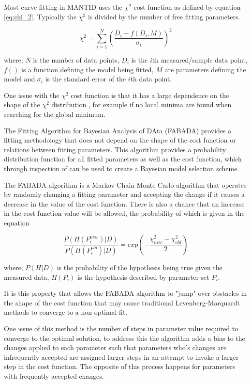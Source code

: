 \documentclass[a4paper]{article}
\begin{document}
Most curve fitting in \gls*{MANTID} uses the $\chi^{2}$ cost function as defined
by equation \ref{eq:chi_2}. Typically the $\chi^{2}$ is divided by the number of
free fitting parameters.

\begin{equation}
  \label{eq:chi_2}
  \chi^{2} = \sum_{i=1}^{N} \left(\frac{D_{i} - f(D_{i}, M)}{\sigma_{i}}\right)^{2}
\end{equation}

where; $N$ is the number of data points, $D_{i}$ is the $i$th measured/sample
data point, $f()$ is a function defining the model being fitted, $M$ are
parameters defining the model and $\sigma_{i}$ is the standard error of the
$i$th data point.

One issue with the $\chi^{2}$ cost function is that it has a large dependence on
the shape of the $\chi^{2}$ distribution \cite{Monserrat2015}, for example if no
local minima are found when searching for the global minimum.

The Fitting Algorithm for Bayesian Analysis of DAta (FABADA) provides a fitting
methodology that does not depend on the shape of the cost function or relations
between fitting parameters. This algorithm provides a probability distribution
function for all fitted parameters as well as the cost function, which through
inspection of can be used to create a Bayesian model selection scheme.

The \gls*{FABADA} algorithm is a Markov Chain Monte Carlo algorithm that
operates by randomly changing a fitting parameter and accepting the change if it
causes a decrease in the value of the cost function. There is also a chance
that an increase in the cost function value will be allowed, the probability of
which is given in the equation \cite{Monserrat2015}

\begin{equation}
  \frac{P(H(P_{i}^{new}) | D)}{P(H(P_{i}^{old})|D)} =
    exp\left(-\frac{\chi^{2}_{new} - \chi^{2}_{old}}{2}\right)
\end{equation}

where; $P(H|D)$ is the probability of the hypothesis being true given the
measured data, $H(P_{i})$ is the hypothesis described by parameter set $P_{i}$.

It is this property that allows the \gls*{FABADA} algorithm to "jump" over
obstacles in the shape of the cost function that may cause traditional
Levenberg-Marquardt methods to converge to a non-optimal fit.

One issue of this method is the number of steps in parameter value required to
converge to the optimal solution, to address this the algorithm adds a bias to
the changes applied to each parameter such that parameters who's changes are
infrequently accepted are assigned larger steps in an attempt to invoke a larger
step in the cost function. The opposite of this process happens for parameters
with frequently accepted changes.
\end{document}
